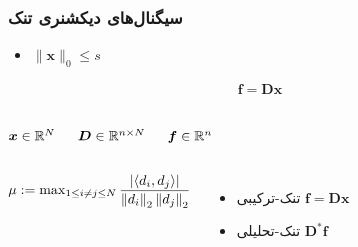 \begin{frame}
\frametitle{سیگنال‌های دیکشنری تنک}
\begin{itemize}
\item{$\|\bm{x}\|_{0}\leq s$}
\end{itemize}
\begin{align}
\label{eq7}
\bm{f} = \bm{D}\bm{x}
\end{align}
\begin{columns}
\begin{center}
$\bm{x}\in \mathbb{R}^{N}$
\end{center}
\begin{center}
$\bm{D}\in \mathbb{R}^{n\times N}$
\end{center}
\begin{center}
$\bm{f}\in \mathbb{R}^{n}$
\end{center}
\end{columns}

\begin{columns}
\begin{block}{}
$\mu := \max_{1\leq i\neq j\leq N} \dfrac{| \langle d_{i},d_{j}\rangle|}{\left\lVert d_{i}\right\rVert_{2}\left\lVert d_{j}\right\rVert_{2}}$
\end{block}
\begin{itemize}
\item{
تنک-ترکیبی
\quad
$\bm{f}= \bm{D}\bm{x}$
}
\item{
تنک-تحلیلی
\quad
$\bm{D}^{\ast}\bm{f}$
}
\end{itemize}
\end{columns}
\end{frame}
